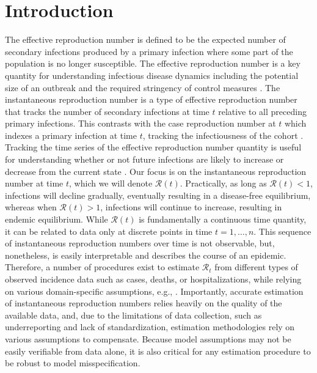 \documentclass[10pt,letterpaper]{article}
\def\calR{\mathcal{R}}
\begin{document}
\linenumbers

\section{Introduction}
\label{sec:intro}

The effective reproduction number is defined to be the expected number of
secondary infections produced by a primary infection where some part of the
population is no longer susceptible. The effective reproduction number is a key
quantity for understanding infectious disease dynamics including the potential
size of an outbreak and the required stringency of control measures
\cite{nishiura2009effective,fraser2007estimating}. The instantaneous
reproduction number is a type of effective reproduction number that tracks the
number of secondary infections at time $t$ relative to all preceding primary
infections. This contrasts with the case reproduction number at $t$ which
indexes a primary infection at time $t$, tracking the infectiousness of the
cohort \cite{gostic2020practical}. Tracking the time series of the effective
reproduction number quantity is useful for understanding whether or not future
infections are likely to increase or decrease from the current state
\cite{anderson1991infectious}. Our focus is on the instantaneous reproduction
number at time $t$, which we will denote $\calR(t)$. Practically, as long as
$\calR(t) < 1$, infections will decline gradually, eventually resulting in a
disease-free equilibrium, whereas when $\calR(t) > 1$, infections will continue
to increase, resulting in endemic equilibrium. While $\calR(t)$ is fundamentally
a continuous time quantity, it can be related to data only at discrete points in
time $t = 1,\ldots,n$. This sequence of instantaneous reproduction numbers over
time is not observable, but, nonetheless, is easily interpretable and describes
the course of an epidemic. Therefore, a number of procedures exist to estimate
$\calR_t$ from different types of observed incidence data such as cases, deaths,
or hospitalizations, while relying on various domain-specific assumptions, e.g.,
\cite{wallinga2004different,hao2020reconstruction,goldstein2023semiparametric,goldstein2024incorporating}.
Importantly, accurate estimation of instantaneous reproduction numbers relies
heavily on the quality of the available data, and, due to the limitations of
data collection, such as underreporting and lack of standardization, estimation
methodologies rely on various assumptions to compensate. Because model
assumptions may not be easily verifiable from data alone, it is also critical
for any estimation procedure to be robust to model misspecification. 
\end{document}
